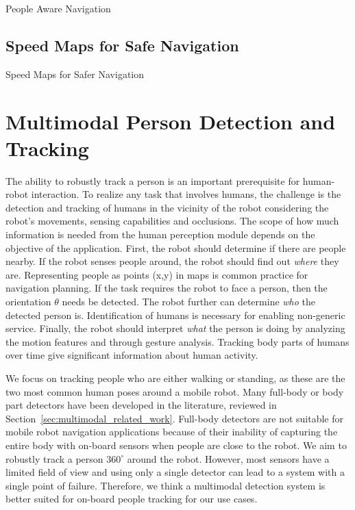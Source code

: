 \documentclass[12pt]{gatech-thesis}
\begin{document}
People Aware Navigation

\section{Speed Maps for Safe Navigation}

Speed Maps for Safer Navigation



\chapter{Multimodal Person Detection and Tracking}
\label{sec:multimodal_person_detection_and_tracking}
The ability to robustly track a person is an important prerequisite for human-robot interaction. To realize any task that involves humans, the challenge is the detection and tracking of humans in the vicinity of the robot considering the robot's movements, sensing capabilities and occlusions. The scope of how much information is needed from the human perception module depends on the objective of the application. First, the robot should determine if there are people nearby. If the robot senses people around, the robot should find out \emph{where} they are. Representing people as points (x,y) in maps is common practice for navigation planning. If the task requires the robot to face a person, then the orientation $\theta$ needs be detected. The robot further can determine \emph{who} the detected person is. Identification of humans is necessary for enabling non-generic service. Finally, the robot should interpret \emph{what} the person is doing by analyzing the motion features and through gesture analysis. Tracking body parts of humans over time give significant information about human activity.

We focus on tracking people who are either walking or standing, as these are the two most common human poses around a mobile robot. Many full-body or body part detectors have been developed in the literature, reviewed in Section~\ref{sec:multimodal_related_work}. Full-body detectors are not suitable for mobile robot navigation applications because of their inability of capturing the entire body with on-board sensors when people are close to the robot. We aim to robustly track a person $360^{\circ}$ around the robot. However, most sensors have a limited field of view and using only a single detector can lead to a system with a single point of failure. Therefore, we think a multimodal detection system is better suited for on-board people tracking for our use cases. 
\end{document}
